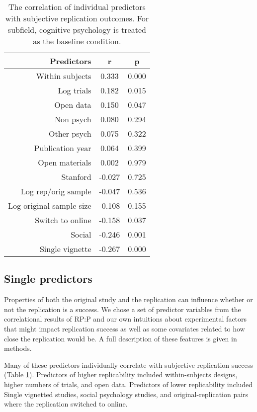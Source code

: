 \documentclass[
  english,
  a4paper,
]{article}
\begin{document}
\begin{table}[!h]

\caption{\label{tab:cor}The correlation of individual predictors with subjective replication outcomes. For subfield, cognitive psychology is treated as the baseline condition.}
\centering
\fontsize{10}{12}\selectfont
\begin{tabular}[t]{r|c|c}
\hline
Predictors & r & p\\
\hline
Within subjects & 0.333 & 0.000\\
\hline
Log trials & 0.182 & 0.015\\
\hline
Open data & 0.150 & 0.047\\
\hline
Non psych & 0.080 & 0.294\\
\hline
Other psych & 0.075 & 0.322\\
\hline
Publication year & 0.064 & 0.399\\
\hline
Open materials & 0.002 & 0.979\\
\hline
Stanford & -0.027 & 0.725\\
\hline
Log rep/orig sample & -0.047 & 0.536\\
\hline
Log original sample size & -0.108 & 0.155\\
\hline
Switch to online & -0.158 & 0.037\\
\hline
Social & -0.246 & 0.001\\
\hline
Single vignette & -0.267 & 0.000\\
\hline
\end{tabular}
\end{table}

\hypertarget{single-predictors}{%
\subsection{Single predictors}\label{single-predictors}}

Properties of both the original study and the replication can influence whether or not the replication is a success. We chose a set of predictor variables from the correlational results of RP:P and our own intuitions about experimental factors that might impact replication success as well as some covariates related to how close the replication would be. A full description of these features is given in methods.

Many of these predictors individually correlate with subjective replication success (Table \ref{tab:cor}). Predictors of higher replicability included within-subjects designs, higher numbers of trials, and open data. Predictors of lower replicability included Single vignetted studies, social psychology studies, and original-replication pairs where the replication switched to online.
\end{document}
